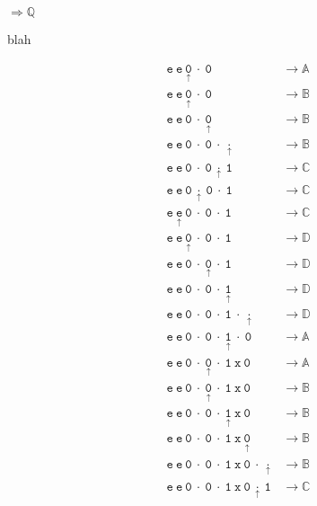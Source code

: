 \documentclass[Master.tex]{subfiles}
\begin{document}
\noindent $\Rightarrow \mathbb{Q}$


\medskip

blah

\begin{equation*}
\begin{aligned}
&\mathtt{e\ e\ \underset{\uparrow}{0}\ \cdot\ 0} & \rightarrow \mathbb{A}\\
&\mathtt{e\ e\ \underset{\uparrow}{0}\ \cdot\ 0} & \rightarrow \mathbb{B}\\
&\mathtt{e\ e\ 0\ \cdot\ \underset{\uparrow}{0}} & \rightarrow \mathbb{B}\\
&\mathtt{e\ e\ 0\ \cdot\ 0\ \cdot\ \underset{\uparrow}{\cdot}} & \rightarrow \mathbb{B}\\
&\mathtt{e\ e\ 0\ \cdot\ 0\ \underset{\uparrow}{\cdot}\ 1} & \rightarrow \mathbb{C}\\
&\mathtt{e\ e\ 0\ \underset{\uparrow}{\cdot}\ 0\ \cdot\ 1} & \rightarrow \mathbb{C}\\
&\mathtt{e\ \underset{\uparrow}{e}\ 0\ \cdot\ 0\ \cdot\ 1} & \rightarrow \mathbb{C}\\
&\mathtt{e\ e\ \underset{\uparrow}{0}\ \cdot\ 0\ \cdot\ 1} & \rightarrow \mathbb{D}\\
&\mathtt{e\ e\ 0\ \cdot\ \underset{\uparrow}{0}\ \cdot\ 1} & \rightarrow \mathbb{D}\\
&\mathtt{e\ e\ 0\ \cdot\ 0\ \cdot\ \underset{\uparrow}{1}} & \rightarrow \mathbb{D}\\
&\mathtt{e\ e\ 0\ \cdot\ 0\ \cdot\ 1\ \cdot\ \underset{\uparrow}{\cdot}} & \rightarrow \mathbb{D}\\
&\mathtt{e\ e\ 0\ \cdot\ 0\ \cdot\ \underset{\uparrow}{1}\ \cdot\ 0} & \rightarrow \mathbb{A}\\
&\mathtt{e\ e\ 0\ \cdot\ \underset{\uparrow}{0}\ \cdot\ 1\ x\ 0} & \rightarrow \mathbb{A}\\
&\mathtt{e\ e\ 0\ \cdot\ \underset{\uparrow}{0}\ \cdot\ 1\ x\ 0} & \rightarrow \mathbb{B}\\
&\mathtt{e\ e\ 0\ \cdot\ 0\ \cdot\ \underset{\uparrow}{1}\ x\ 0} & \rightarrow \mathbb{B}\\
&\mathtt{e\ e\ 0\ \cdot\ 0\ \cdot\ 1\ x\ \underset{\uparrow}{0}} & \rightarrow \mathbb{B}\\
&\mathtt{e\ e\ 0\ \cdot\ 0\ \cdot\ 1\ x\ 0\ \cdot\ \underset{\uparrow}{\cdot}} & \rightarrow \mathbb{B}\\
&\mathtt{e\ e\ 0\ \cdot\ 0\ \cdot\ 1\ x\ 0\ \underset{\uparrow}{\cdot}\ 1} & \rightarrow \mathbb{C}\\

\end{aligned}
\end{equation*}
\end{document}

